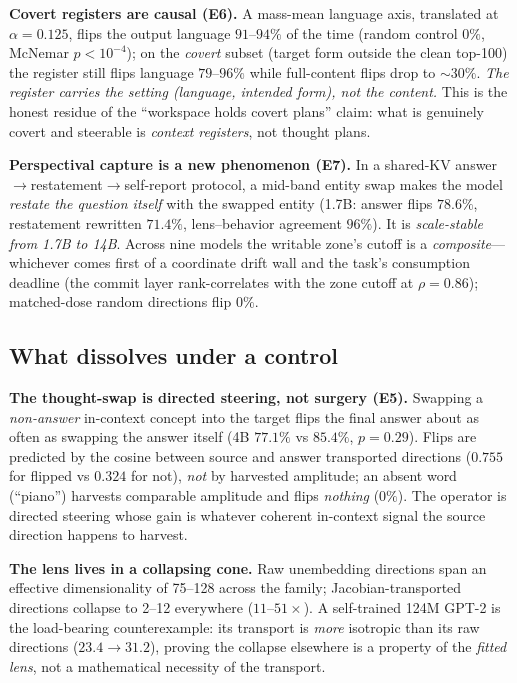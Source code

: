 \documentclass[11pt]{article}
\newcommand{\pct}{\%}
\begin{document}
\textbf{Covert registers are causal (E6).} A mass-mean language axis, translated
at $\alpha{=}0.125$, flips the output language $91$--$94\pct$ of the time (random
control $0\pct$, McNemar $p{<}10^{-4}$); on the \emph{covert} subset (target form
outside the clean top-100) the register still flips language $79$--$96\pct$ while
full-content flips drop to $\sim30\pct$. \emph{The register carries the setting
(language, intended form), not the content.} This is the honest residue of the
``workspace holds covert plans'' claim: what is genuinely covert and steerable is
\emph{context registers}, not thought plans.

\textbf{Perspectival capture is a new phenomenon (E7).} In a shared-KV
answer$\to$restatement$\to$self-report protocol, a mid-band entity swap makes the
model \emph{restate the question itself} with the swapped entity (1.7B: answer
flips $78.6\pct$, restatement rewritten $71.4\pct$, lens--behavior agreement
$96\pct$). It is \emph{scale-stable from 1.7B to 14B}. Across nine models the
writable zone's cutoff is a \emph{composite}---whichever comes first of a
coordinate drift wall and the task's consumption deadline (the commit layer
rank-correlates with the zone cutoff at $\rho{=}0.86$); matched-dose random
directions flip $0\pct$.

\subsection{What dissolves under a control}

\textbf{The thought-swap is directed steering, not surgery (E5).} Swapping a
\emph{non-answer} in-context concept into the target flips the final answer about
as often as swapping the answer itself (4B $77.1\pct$ vs $85.4\pct$, $p{=}0.29$).
Flips are predicted by the cosine between source and answer transported
directions ($0.755$ for flipped vs $0.324$ for not), \emph{not} by harvested
amplitude; an absent word (``piano'') harvests comparable amplitude and flips
\emph{nothing} ($0\pct$). The operator is directed steering whose gain is
whatever coherent in-context signal the source direction happens to harvest.

\textbf{The lens lives in a collapsing cone.} Raw unembedding directions span an
effective dimensionality of 75--128 across the family; Jacobian-transported
directions collapse to 2--12 everywhere ($11$--$51\times$). A self-trained 124M
GPT-2 is the load-bearing counterexample: its transport is \emph{more} isotropic
than its raw directions ($23.4{\to}31.2$), proving the collapse elsewhere is a
property of the \emph{fitted lens}, not a mathematical necessity of the transport.
\end{document}
